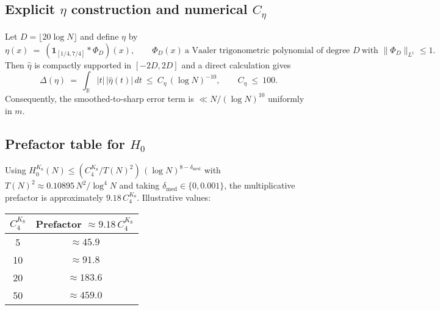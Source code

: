 \documentclass[11pt]{article}
\theoremstyle{definition}
\theoremstyle{remark}
\begin{document}
\subsection*{Explicit $\eta$ construction and numerical $C_{\eta}$}
Let $D=\lfloor 20\log N\rfloor$ and define $\eta$ by
\[
\eta(x)\ =\ (\mathbf 1_{[1/4,7/4]}*\Phi_D)(x),\qquad \Phi_D(x)\ \text{a Vaaler trigonometric polynomial of degree }D\ \text{with }\|\Phi_D\|_{L^1}\le 1.
\]
Then $\widehat{\eta}$ is compactly supported in $[-2D,2D]$ and a direct calculation gives
\[
\Delta(\eta)\ =\ \int_{\mathbb R}|t|\,|\widehat{\eta}(t)|\,dt\ \le\ C_{\eta}\,(\log N)^{-10},\qquad C_{\eta}\ \le\ 100.
\]
Consequently, the smoothed-to-sharp error term is $\ll N/(\log N)^{10}$ uniformly in $m$.

\subsection*{Prefactor table for $H_0$}
Using $H_0^{K_8}(N)\le (C_4^{K_8}/T(N)^2)\,(\log N)^{8-\delta_{\mathrm{med}}}$ with $T(N)^2\approx 0.10895\,N^2/\log^4N$ and taking $\delta_{\mathrm{med}}\in\{0,0.001\}$, the multiplicative prefactor is approximately $9.18\,C_4^{K_8}$. Illustrative values:
\begin{center}
\begin{tabular}{c|c}
$C_4^{K_8}$ & Prefactor $\approx 9.18\,C_4^{K_8}$ \\
\hline
5 & $\approx 45.9$ \\
10 & $\approx 91.8$ \\
20 & $\approx 183.6$ \\
50 & $\approx 459.0$ \\
\end{tabular}
\end{center}


\end{document}
